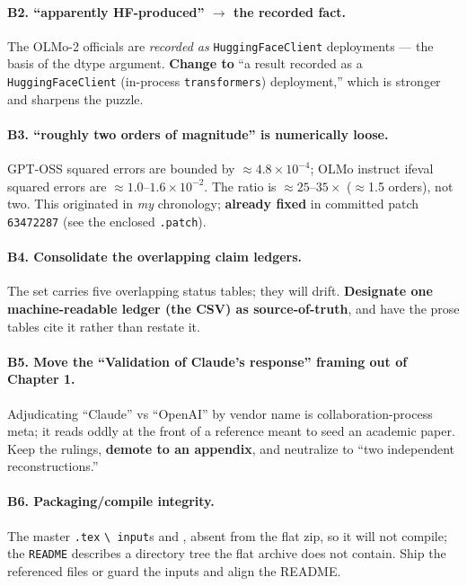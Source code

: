 \documentclass[11pt]{article}
\newcommand{\code}[1]{\texttt{#1}}
\begin{document}
\paragraph{B2. ``apparently HF-produced'' $\rightarrow$ the recorded fact.} The OLMo-2
officials are \emph{recorded as} \code{HuggingFaceClient} deployments --- the basis of the
dtype argument. \textbf{Change to} ``a result recorded as a \code{HuggingFaceClient}
(in-process \code{transformers}) deployment,'' which is stronger and sharpens the puzzle.

\paragraph{B3. ``roughly two orders of magnitude'' is numerically loose.} GPT-OSS squared
errors are bounded by $\approx 4.8\times10^{-4}$; OLMo instruct ifeval squared errors are
$\approx 1.0$--$1.6\times10^{-2}$. The ratio is $\approx 25$--$35\times$ ($\approx$1.5
orders), not two. This originated in \emph{my} chronology; \textbf{already fixed} in
committed patch \code{63472287} (see the enclosed \code{.patch}).

\paragraph{B4. Consolidate the overlapping claim ledgers.} The set carries five
overlapping status tables; they will drift. \textbf{Designate one machine-readable ledger
(the CSV) as source-of-truth}, and have the prose tables cite it rather than restate it.

\paragraph{B5. Move the ``Validation of Claude's response'' framing out of Chapter 1.}
Adjudicating ``Claude'' vs ``OpenAI'' by vendor name is collaboration-process meta; it
reads oddly at the front of a reference meant to seed an academic paper. Keep the
rulings, \textbf{demote to an appendix}, and neutralize to ``two independent
reconstructions.''

\paragraph{B6. Packaging/compile integrity.} The master \code{.tex} \code{\textbackslash
input}s  and
, absent from the flat zip, so it will not
compile; the \code{README} describes a directory tree the flat archive does not contain.
Ship the referenced files or guard the inputs and align the README.
\end{document}
